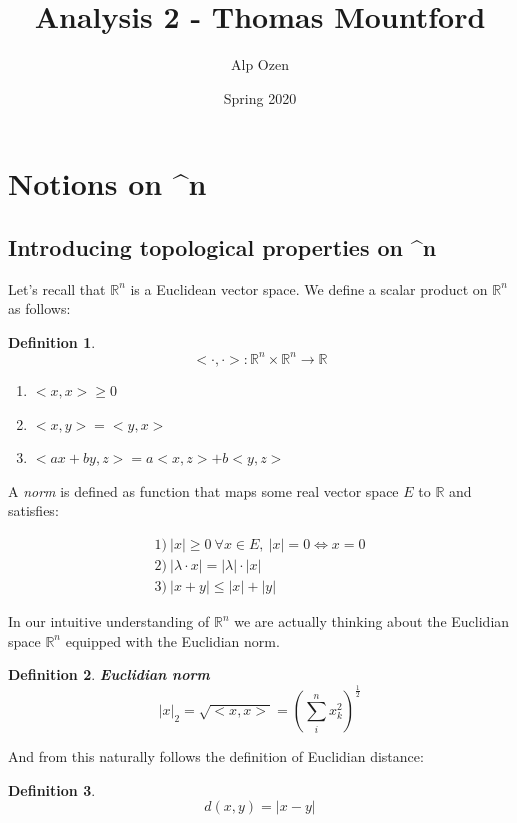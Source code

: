 \documentclass[titlepage]{article}
\title{\textbf{Analysis 2 - Thomas Mountford}}
\author{Alp Ozen}
\date{Spring 2020}
\newtheorem{definition}{Definition}
\newcommand{\Rn}{\mathbb{R}^n}
\begin{document}
\maketitle
\tableofcontents
\clearpage


\section{Notions on \Rn}

\subsection{Introducing topological properties on \Rn}
Let's recall that $\Rn$ is a Euclidean vector space. We define a scalar product on $\Rn$ as follows:

\begin{definition}
\begin{equation*}
    < \cdot, \cdot > : \Rn \times \Rn \to \mathbb{R}
\end{equation*}


\begin{enumerate}
    \item $<x,x> \geq 0$
    \item $<x,y> = <y,x>$
    \item $<ax + by, z> = a<x,z> + b<y,z>$
\end{enumerate}

\end{definition}


A \textit{norm} is defined as function that maps some real vector space $E$ to $\mathbb{R}$ and satisfies:

\begin{align*}
    1) \ |x| \geq 0 \ \forall x \in E, \ |x| = 0 \iff x = 0\\
    2) \ |\lambda \cdot x| = |\lambda| \cdot |x| \\
    3) \ |x+y| \leq |x| + |y|
\end{align*}

In our intuitive understanding of $\Rn$ we are actually thinking about the Euclidian space $\Rn$ equipped with the Euclidian norm.

\begin{definition}\textbf{Euclidian norm}
$$|x|_{2} = \sqrt{<x,x>} = (\sum^{n}_{i}x^{2}_{k} )^{\frac{1}{2}} $$
\end{definition}

And from this naturally follows the definition of Euclidian distance:
\begin{definition}
$$d(x,y) = |x-y|$$
\end{definition}
\end{document}
